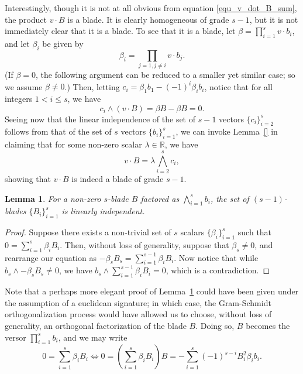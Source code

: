 \documentclass{birkjour}
\newtheorem{lem}[thm]{Lemma}
\theoremstyle{definition}
\theoremstyle{remark}
\numberwithin{equation}{section}
\newcommand{\R}{\mathbb{R}}
\begin{document}
Interestingly, though it is not at all obvious from equation \eqref{equ_v_dot_B_sum}, the product
$v\cdot B$ is a blade.  It is clearly homogeneous of grade $s-1$, but it is not
immediately clear that it is a blade.  To see that it is a blade, let $\beta=\prod_{i=1}^s v\cdot b_i$,
and let $\beta_i$ be given by
\begin{equation*}
\beta_i=\prod_{j=1,j\neq i}v\cdot b_j.
\end{equation*}
(If $\beta=0$, the following argument can be reduced to a smaller yet similar case; so
we assume $\beta\neq 0$.)
Then, letting $c_i=\beta_1b_1-(-1)^i\beta_ib_i$, notice that for all integers $1<i\leq s$,
we have
\begin{equation*}
c_i\wedge (v\cdot B)=\beta B-\beta B=0.
\end{equation*}
Seeing now that the linear independence of the set of $s-1$ vectors
$\{c_i\}_{i=2}^s$ follows from that of the set of $s$ vectors $\{b_i\}_{i=1}^s$,
we can invoke Lemma~\ref{} in claiming that for some non-zero scalar $\lambda\in\R$,
we have
\begin{equation*}
v\cdot B = \lambda\bigwedge_{i=2}^s c_i,
\end{equation*}
showing that $v\cdot B$ is indeed a blade of grade $s-1$.

\begin{lem}\label{lem_B_i_lin_indep}
For a non-zero $s$-blade $B$ factored as $\bigwedge_{i=1}^s b_i$, the set of
$(s-1)$-blades $\{B_i\}_{i=1}^s$ is linearly independent.
\end{lem}
\begin{proof}
Suppose there exists a non-trivial set of $s$ scalars $\{\beta_i\}_{i=1}^s$
such that $0 = \sum_{i=1}^s\beta_i B_i$.
Then, without loss of generality, suppose that $\beta_s\neq 0$, and rearrange
our equation as $-\beta_sB_s=\sum_{i=1}^{s-1}\beta_iB_i$.  Now notice
that while $b_s\wedge-\beta_sB_s\neq 0$, we have $b_s\wedge\sum_{i=1}^{s-1}\beta_iB_i=0$,
which is a contradiction.
\end{proof}

Note that a perhaps more elegant proof of Lemma~\ref{lem_B_i_lin_indep} could have been given
under the assumption
of a euclidean signature; in which case, the Gram-Schmidt orthogonalization process would have
allowed us to choose, without loss of generality, an orthogonal factorization of the blade $B$.
Doing so, $B$ becomes the versor $\prod_{i=1}^s b_i$, and we may write
\begin{equation*}
0 = \sum_{i=1}^s \beta_iB_i \iff
0=\left(\sum_{i=1}^s\beta_iB_i\right)B = -\sum_{i=1}^s(-1)^{s-i}B_i^2\beta_ib_i.
\end{equation*}



\begin{thebibliography}{9}

\end{thebibliography}
\end{document}

